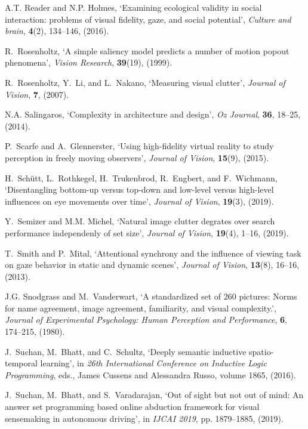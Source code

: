 \documentclass[a4paper]{article}
\begin{document}
\begin{thebibliography}{10}
A.T. Reader and N.P. Holmes, `Examining ecological validity in social
  interaction: problems of visual fidelity, gaze, and social potential', {\em
  Culture and brain}, {\bf 4}(2),  134--146, (2016).

R.~Rosenholtz, `A simple saliency model predicts a number of motion popout
  phenomena', {\em Vision Research}, {\bf 39}(19), (1999).

R.~Rosenholtz, Y.~Li, and L.~Nakano, `Measuring visual clutter', {\em Journal
  of Vision}, {\bf 7}, (2007).

N.A. Salingaros, `Complexity in architecture and design', {\em Oz Journal},
  {\bf 36},  18--25, (2014).

P.~Scarfe and A.~Glennerster, `Using high-fidelity virtual reality to study
  perception in freely moving observers', {\em Journal of Vision}, {\bf 15}(9),
  (2015).

H.~Sch{\"u}tt, L.~Rothkegel, H.~Trukenbrod, R.~Engbert, and F.~Wichmann,
  `Disentangling bottom-up versus top-down and low-level versus high-level
  influences on eye movements over time', {\em Journal of Vision}, {\bf 19}(3),
  (2019).

Y.~Semizer and M.M. Michel, `Natural image clutter degrates over search
  performance independenly of set size', {\em Journal of Vision}, {\bf 19}(4),
  1--16, (2019).

T.~Smith and P.~Mital, `Attentional synchrony and the influence of viewing task
  on gaze behavior in static and dynamic scenes', {\em Journal of Vision}, {\bf
  13}(8),  16--16, (2013).

J.G. Snodgrass and M.~Vanderwart, `A standardized set of 260 pictures: Norms
  for name agreement, image agreement, familiarity, and visual complexity.',
  {\em Journal of Experimental Psychology: Human Perception and Performance},
  {\bf 6},  174--215, (1980).

J.~Suchan, M.~Bhatt, and C.~Schultz, `Deeply semantic inductive spatio-temporal
  learning', in {\em 26th International Conference on Inductive Logic
  Programming}, eds., James Cussens and Alessandra Russo, volume 1865, (2016).

J.~Suchan, M.~Bhatt, and S.~Varadarajan, `Out of sight but not out of mind: An
  answer set programming based online abduction framework for visual
  sensemaking in autonomous driving', in {\em IJCAI 2019}, pp. 1879--1885,
  (2019).


\end{thebibliography}
\end{document}

